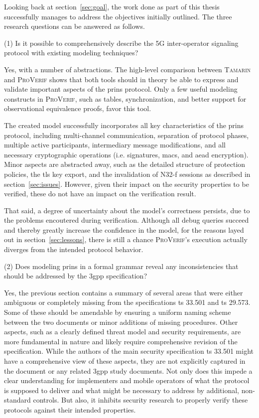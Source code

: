 Looking back at section~\ref{sec:goal}, the work done as part of this thesis successfully manages to address the objectives initially outlined.
The three research questions can be answered as follows.\bigskip

\noindent
(1) Is it possible to comprehensively describe the 5G inter-operator signaling protocol with existing modeling techniques?

Yes, with a number of abstractions.
The high-level comparison between \textsc{Tamarin} and \textsc{ProVerif} shows that both tools should in theory be able to express and validate important aspects of the \gls{prins} protocol.
Only a few useful modeling constructs in \textsc{ProVerif}, such as tables, synchronization, and better support for observational equivalence proofs, favor this tool.

The created model successfully incorporates all key characteristics of the \gls{prins} protocol, including multi-channel communication, separation of protocol phases, multiple active participants, intermediary message modifications, and all necessary cryptographic operations (i.e. signatures, \glspl{mac}, and \gls{aead} encryption).
Minor aspects are abstracted away, such as the detailed structure of protection policies, the \gls{tls} key export, and the invalidation of N32-f sessions as described in section~\ref{sec:issues}.
However, given their impact on the security properties to be verified, these do not have an impact on the verification result.

That said, a degree of uncertainty about the model's correctness persists, due to the problems encoutered during verification.
Although all debug queries succeed and thereby greatly increase the confidence in the model, for the reasons layed out in section~\ref{sec:lessons}, there is still a chance \textsc{ProVerif}'s execution actually diverges from the intended protocol behavior.\bigskip

\noindent
(2) Does modeling \gls{prins} in a formal grammar reveal any inconsistencies that should be addressed by the \gls{3gpp} specification?

Yes, the previous section contains a summary of several areas that were either ambiguous or completely missing from the specifications \gls{ts} 33.501 and \gls{ts} 29.573.
Some of these should be amendable by ensuring a uniform naming scheme between the two documents or minor additions of missing procedures.
Other aspects, such as a clearly defined threat model and security requirements, are more fundamental in nature and likely require comprehensive revision of the specification.
While the authors of the main security specification \gls{ts} 33.501 might have a comprehensive view of these aspects, they are not explicitly captured in the document or any related \gls{3gpp} study documents.
Not only does this impede a clear understanding for implementers and mobile operators of what the protocol is supposed to deliver and what might be necessary to address by additional, non-standard controls.
But also, it inhibits security research to properly verify these protocols against their intended properties.


